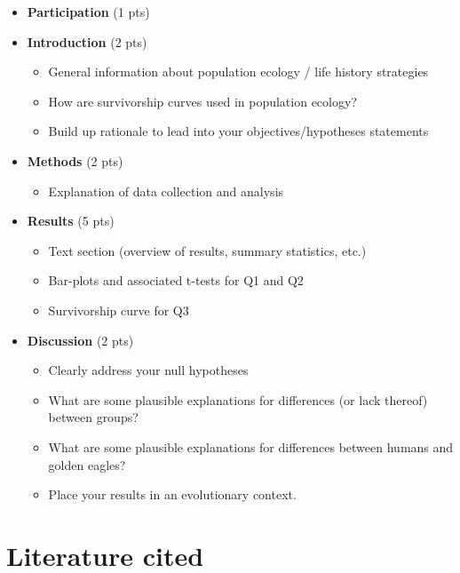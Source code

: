 \documentclass[11pt,]{article}
\providecommand{\tightlist}{%
\setlength{\itemsep}{0pt}\setlength{\parskip}{0pt}}
\begin{document}
\begin{itemize}
\item
  \textbf{Participation} (1 pts)
\item
  \textbf{Introduction} (2 pts)

  \begin{itemize}
  \tightlist
  \item
    General information about population ecology / life history
    strategies
  \item
    How are survivorship curves used in population ecology?
  \item
    Build up rationale to lead into your objectives/hypotheses
    statements
  \end{itemize}
\item
  \textbf{Methods} (2 pts)

  \begin{itemize}
  \tightlist
  \item
    Explanation of data collection and analysis
  \end{itemize}
\item
  \textbf{Results} (5 pts)

  \begin{itemize}
  \tightlist
  \item
    Text section (overview of results, summary statistics, etc.)
  \item
    Bar-plots and associated t-tests for Q1 and Q2
  \item
    Survivorship curve for Q3
  \end{itemize}
\item
  \textbf{Discussion} (2 pts)

  \begin{itemize}
  \tightlist
  \item
    Clearly address your null hypotheses
  \item
    What are some plausible explanations for differences (or lack
    thereof) between groups?
  \item
    What are some plausible explanations for differences between humans
    and golden eagles?
  \item
    Place your results in an evolutionary context.
  \end{itemize}
\end{itemize}

\medskip

\hypertarget{literature-cited}{%
\section{Literature cited}\label{literature-cited}}
\end{document}
